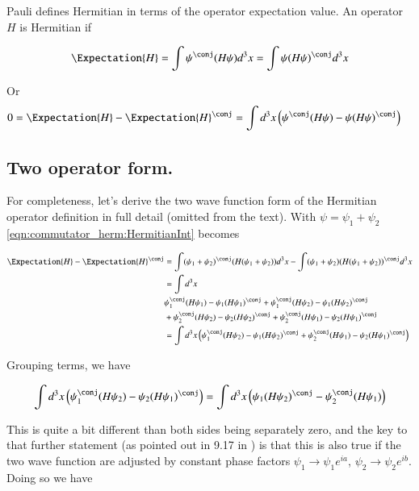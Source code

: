 Pauli defines Hermitian in terms of the operator expectation value.  An operator $H$ is Hermitian if

\begin{align}\label{eqn:commutator_herm:Hermitian}
\Expectation{H} = \int \psi^\conj (H \psi) d^3 x = \int \psi (H \psi)^\conj d^3 x
\end{align}

Or
\begin{align}\label{eqn:commutator_herm:HermitianInt}
0 &= \Expectation{H} - \Expectation{H}^\conj = \int d^3 x \left( \psi^\conj (H \psi) - \psi (H \psi)^\conj \right)
\end{align}

\subsection{Two operator form. }

For completeness, let's derive the two wave function form of the Hermitian operator definition in full detail (omitted from the text).  With $\psi = \psi_1 + \psi_2$
\ref{eqn:commutator_herm:HermitianInt} becomes

\begin{align*}
\Expectation{H} - \Expectation{H}^\conj
&= \int (\psi_1 + \psi_2)^\conj (H (\psi_1 + \psi_2)) d^3 x - \int (\psi_1 + \psi_2) (H (\psi_1 + \psi_2))^\conj d^3 x \\
&= \int d^3 x \\
&\psi_1^\conj (H \psi_1) - \psi_1 (H \psi_1)^\conj 
+\psi_1^\conj (H \psi_2) - \psi_1 (H \psi_2)^\conj \\
&+\psi_2^\conj (H \psi_2) - \psi_2 (H \psi_2)^\conj 
+\psi_2^\conj (H \psi_1) - \psi_2 (H \psi_1)^\conj \\
&= \int d^3 x
\left( \psi_1^\conj (H \psi_2) - \psi_1 (H \psi_2)^\conj 
+\psi_2^\conj (H \psi_1) - \psi_2 (H \psi_1)^\conj \right) \\
\end{align*}

Grouping terms, we have 

\begin{align*}
\int d^3 x \left( \psi_1^\conj (H \psi_2) - \psi_2 (H \psi_1)^\conj \right) = \int d^3 x \left( \psi_1 (H \psi_2)^\conj - \psi_2^\conj (H \psi_1) \right)
\end{align*}

This is quite a bit different than both sides being separately zero, and the key to that further statement (as pointed out in 9.17 in \citep{bohm1989qt}) 
is that this is also true if the two wave function are adjusted by constant phase factors
$\psi_1 \rightarrow \psi_1 e^{ia}$, 
$\psi_2 \rightarrow \psi_2 e^{ib}$.  Doing so we have

